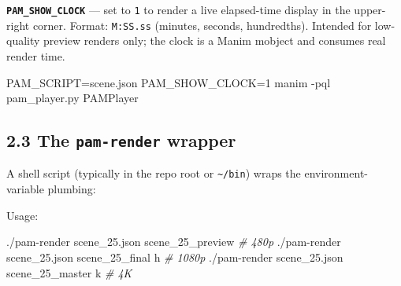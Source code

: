 \documentclass[
  12pt,
  letterpaper,
]{book}
\newenvironment{Shaded}{}{}
\newcommand{\AttributeTok}[1]{\textcolor[rgb]{0.49,0.56,0.16}{#1}}
\newcommand{\CommentTok}[1]{\textcolor[rgb]{0.38,0.63,0.69}{\textit{#1}}}
\newcommand{\DataTypeTok}[1]{\textcolor[rgb]{0.56,0.13,0.00}{#1}}
\newcommand{\ExtensionTok}[1]{#1}
\newcommand{\NormalTok}[1]{#1}
\newcommand{\OperatorTok}[1]{\textcolor[rgb]{0.40,0.40,0.40}{#1}}
\newcommand{\StringTok}[1]{\textcolor[rgb]{0.25,0.44,0.63}{#1}}
\newcommand{\VariableTok}[1]{\textcolor[rgb]{0.10,0.09,0.49}{#1}}
\begin{document}
\textbf{\texttt{PAM\_SHOW\_CLOCK}} --- set to \texttt{1} to render a
live elapsed-time display in the upper-right corner. Format:
\texttt{M:SS.ss} (minutes, seconds, hundredths). Intended for
low-quality preview renders only; the clock is a Manim mobject and
consumes real render time.

\begin{Shaded}
\begin{Highlighting}[]
\VariableTok{PAM\_SCRIPT}\OperatorTok{=}\NormalTok{scene.json }\VariableTok{PAM\_SHOW\_CLOCK}\OperatorTok{=}\NormalTok{1 }\ExtensionTok{manim} \AttributeTok{{-}pql}\NormalTok{ pam\_player.py PAMPlayer}
\end{Highlighting}
\end{Shaded}

\subsection{\texorpdfstring{2.3 The \texttt{pam-render}
wrapper}{2.3 The pam-render wrapper}}\label{the-pam-render-wrapper}

A shell script (typically in the repo root or
\texttt{\textasciitilde{}/bin}) wraps the environment-variable plumbing:

\begin{Shaded}
\end{Shaded}

Usage:

\begin{Shaded}
\begin{Highlighting}[]
\ExtensionTok{./pam{-}render}\NormalTok{ scene\_25.json scene\_25\_preview        }\CommentTok{\# 480p}
\ExtensionTok{./pam{-}render}\NormalTok{ scene\_25.json scene\_25\_final     h    }\CommentTok{\# 1080p}
\ExtensionTok{./pam{-}render}\NormalTok{ scene\_25.json scene\_25\_master    k    }\CommentTok{\# 4K}
\end{Highlighting}
\end{Shaded}
\end{document}
